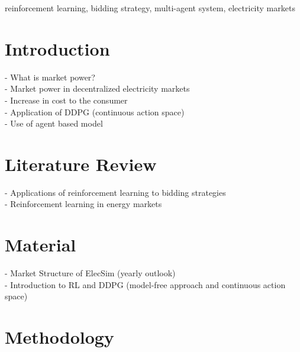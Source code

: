 \documentclass[conference]{IEEEtran}
\begin{document}
\begin{IEEEkeywords}
reinforcement learning, bidding strategy, multi-agent system, electricity markets
\end{IEEEkeywords}

\section{Introduction}

- What is market power? \\
- Market power in decentralized electricity markets \\
- Increase in cost to the consumer \\





- Application of DDPG (continuous action space) \cite{Kell2020} \\
- Use of agent based model\\














\section{Literature Review}

- Applications of reinforcement learning to bidding strategies \\
- Reinforcement learning in energy markets \\


\section{Material}

- Market Structure of ElecSim (yearly outlook) \\
- Introduction to RL and DDPG (model-free approach and continuous action space)

\section{Methodology}
\end{document}
